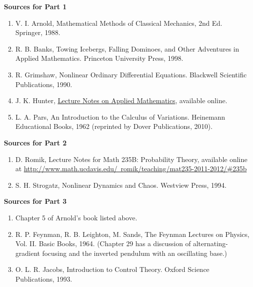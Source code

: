 \documentclass[11pt]{report}
\theoremstyle{plain}
\theoremstyle{definition}
\begin{document}
\textbf{Sources for Part 1}

\begin{enumerate}[label=\arabic*.]
\item V. I. Arnold, Mathematical Methods of Classical Mechanics, 2nd Ed. Springer, 1988.

\item R. B. Banks, Towing Icebergs, Falling Dominoes, and Other Adventures in Applied Mathematics. Princeton University Press, 1998.

\item R. Grimshaw, Nonlinear Ordinary Differential Equations. Blackwell Scientific Publications, 1990.

\item J. K. Hunter, \href{http://www.math.ucdavis.edu/~hunter/m280_09/applied_math.html}{Lecture Notes on Applied Mathematics}, available online.

\item L. A. Pars, An Introduction to the Calculus of Variations. Heinemann Educational Books, 1962 (reprinted by Dover Publications, 2010).
\end{enumerate}

\textbf{Sources for Part 2}

\begin{enumerate}[label=\arabic*., start=6]
\item D. Romik, Lecture Notes for Math 235B: Probability Theory, available online at \href{http://www.math.ucdavis.edu/~romik/teaching/mat235-2011-2012/\#235b}{http://www.math.ucdavis.edu/~romik/teaching/mat235-2011-2012/\#235b}

\item S. H. Strogatz, Nonlinear Dynamics and Chaos. Westview Press, 1994.
\end{enumerate}

\textbf{Sources for Part 3}

\begin{enumerate}[label=\arabic*., start=8]
\item Chapter 5 of Arnold's book listed above.

\item R. P. Feynman, R. B. Leighton, M. Sands, The Feynman Lectures on Physics, Vol. II. Basic Books, 1964. (Chapter 29 has a discussion of alternating-gradient focusing and the inverted pendulum with an oscillating base.)

\item O. L. R. Jacobs, Introduction to Control Theory. Oxford Science Publications, 1993.
\end{enumerate}
\end{document}
